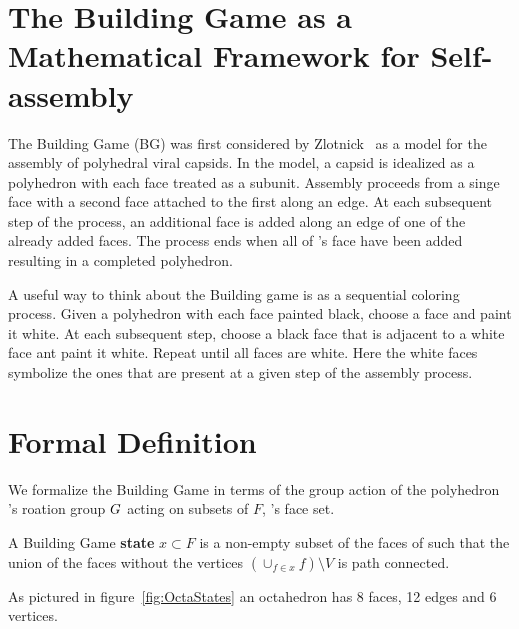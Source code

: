 
\section{The Building Game as a Mathematical Framework for Self-assembly}

The Building Game (BG) was first considered by Zlotnick~\cite{Zlotnick1994} as a model for the assembly of polyhedral viral capsids. In the model, a capsid is idealized as a polyhedron \poly\spc with each face treated as a subunit. Assembly proceeds from a singe face with a second face attached to the first along an edge. At each subsequent step of the process, an additional face is added along an edge of one of the already added faces. The process ends when all of \poly's face have been added resulting in a completed polyhedron.

A useful way to think about the Building game is as a sequential coloring process. Given a polyhedron with each face painted black, choose a face and paint it white. At each subsequent step, choose a black face that is adjacent to a white face ant paint it white. Repeat until all faces are white. Here the white faces symbolize the ones that are present at a given step of the assembly process.

\section{Formal Definition}
We formalize the Building Game in terms of the group action of the polyhedron \poly's roation group ${G}$ acting on subsets of $F$, \poly's face set. 

\begin{mydef}
  A Building Game \textbf{state} $x \subset F$ is a non-empty subset of the faces of \poly such that the union of the faces without the vertices $\left(\cup_{f \in x}f\right) \setminus V$ is path connected. 
\end{mydef} 


As pictured in figure~\ref{fig:OctaStates} an octahedron has 8 faces, 12 edges and 6 vertices. 

